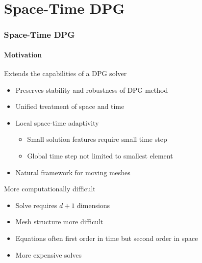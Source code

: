 \documentclass[18pt,xcolor=table]{beamer}
\begin{document}
\section{Space-Time DPG}
\begin{frame}[t]
\frametitle{Space-Time DPG}
\framesubtitle{Motivation}
Extends the capabilities of a DPG solver
\begin{itemize}
  \item Preserves stability and robustness of DPG method
  \item Unified treatment of space and time
  \item Local space-time adaptivity
  \begin{itemize}
    \item Small solution features require small time step
    \item Global time step not limited to smallest element
  \end{itemize}
  \item Natural framework for moving meshes
\end{itemize}
\bigskip

More computationally difficult
\begin{itemize}
  \item Solve requires $d+1$ dimensions
  \item Mesh structure more difficult
  \item Equations often first order in time but second order in space
  \item More expensive solves
\end{itemize}
\end{frame}
\end{document}
